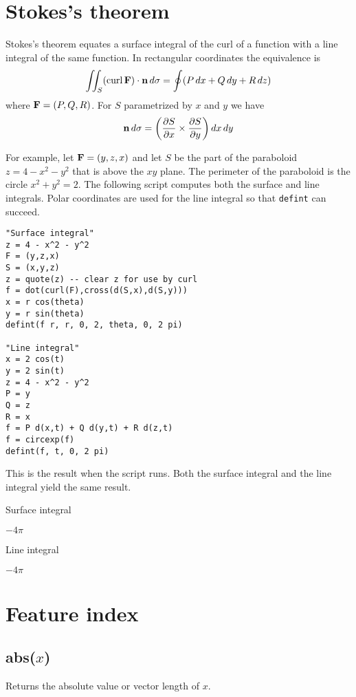 \documentclass[12pt]{article}
\begin{document}
\newpage

\section{Stokes's theorem}

Stokes's theorem equates a surface integral of the curl of a function
with a line integral of the same function.
In rectangular coordinates the equivalence is
%
$$
\iint_S(\mathop{\rm curl}{\bf F})\cdot{\bf n}\,d\sigma
=\oint (P\,dx+Q\,dy+R\,dz)
$$
%
where ${\bf F}=(P,Q,R)$.
For $S$ parametrized by $x$ and $y$ we have
$${\bf n}\,d\sigma=\left(
\frac{\partial S}{\partial x}\times\frac{\partial S}{\partial y}
\right)dx\,dy$$

For example,
let ${\bf F}=(y,z,x)$ and let $S$ be the part of the paraboloid
$z=4-x^2-y^2$
that is above the $xy$ plane.
The perimeter of the paraboloid is the circle $x^2+y^2=2$.
The following script computes both the surface and line integrals.
Polar coordinates are used for the line integral so that \verb$defint$ can succeed.

{\color{blue}
\begin{verbatim}
"Surface integral"
z = 4 - x^2 - y^2
F = (y,z,x)
S = (x,y,z)
z = quote(z) -- clear z for use by curl
f = dot(curl(F),cross(d(S,x),d(S,y)))
x = r cos(theta)
y = r sin(theta)
defint(f r, r, 0, 2, theta, 0, 2 pi)

"Line integral"
x = 2 cos(t)
y = 2 sin(t)
z = 4 - x^2 - y^2
P = y
Q = z
R = x
f = P d(x,t) + Q d(y,t) + R d(z,t)
f = circexp(f)
defint(f, t, 0, 2 pi)
\end{verbatim}
}

This is the result when the script runs.
Both the surface integral and the line integral
yield the same result.

\bigskip
Surface integral

$\displaystyle -4\pi$

Line integral

$\displaystyle -4\pi$

\newpage

\section{Feature index}

\subsection*{abs($x$)}

Returns the absolute value or vector length of $x$.
\end{document}
